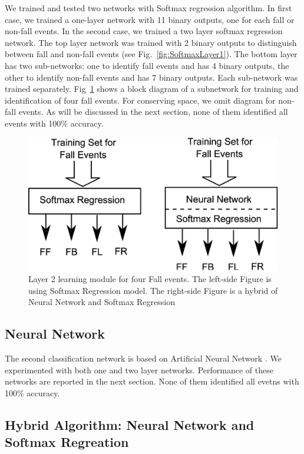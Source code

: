 \documentclass{IEEEtran}
\begin{document}
We trained and tested two networks with Softmax regression algorithm. In first case, we trained a one-layer network with 11 binary outputs, one for each fall or non-fall events. In the second case, we trained a two layer softmax regression network. The top layer network was trained with 2 binary outputs to distinguish between fall and non-fall events (see Fig.~\ref{fig:SoftmaxLayer1}). The bottom layer has two sub-networks:  one to identify fall events and has 4 binary outputs, the other to identify non-fall events and has 7 binary outputs. Each sub-network was trained separately. Fig~\ref{fig:SoftmaxLayer2Fall} shows a block diagram of a subnetwork for training and identification of four fall events. For conserving space, we omit diagram for non-fall events. As will be discussed in the next section, none of them identified all events with 100\% accuracy.

\begin{figure}[htbp]
	\centering
		\includegraphics[width=0.98\columnwidth]{figures/SoftmaxLayer2Fall.eps}
	\caption{Layer 2 learning module for four Fall events. The left-side Figure is using Softmax Regression model. The right-side Figure is a hybrid of Neural Network and Softmax Regression }
	\label{fig:SoftmaxLayer2Fall}
\end{figure}

\subsection{Neural Network}
\label{sec:NeuralNetwork}
The second classification network is based on Artificial Neural Network \cite{Bishop06a}. We experimented with both one and two layer networks. Performance of these networks are reported in the next section. None of them identified all evetns with 100\% accuracy.

\subsection{Hybrid Algorithm: Neural Network and Softmax Regreation}
\label{sec:HybridAlgorithmNeuralNetworkAndSoftmaxRegreation}
\end{document}
